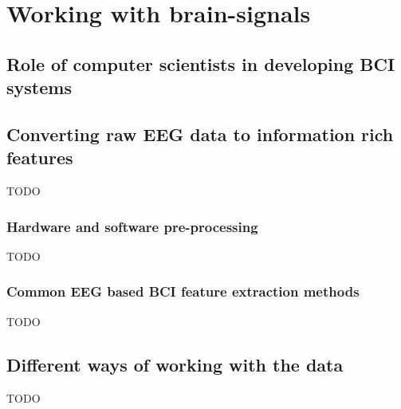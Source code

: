 
\glsresetall

\chapter{Working with brain-signals}
\label{ch:processing_signals}


\section{Role of computer scientists in developing BCI systems}
\label{sec:processing_signals_why_cs}

\lipsum[1-3]


\section{Converting raw EEG data to information rich features}
\label{sec:processing_signals_useful_data}
TODO



\subsection{Hardware and software pre-processing}
\label{subsec:processing_signals_useful_data_preproc}
TODO



\subsection{Common EEG based BCI feature extraction methods}
\label{subsec:processing_signals_useful_data_feature}

TODO



\section{Different ways of working with the data}
\label{sec:processing_signals_interpreting}
TODO


